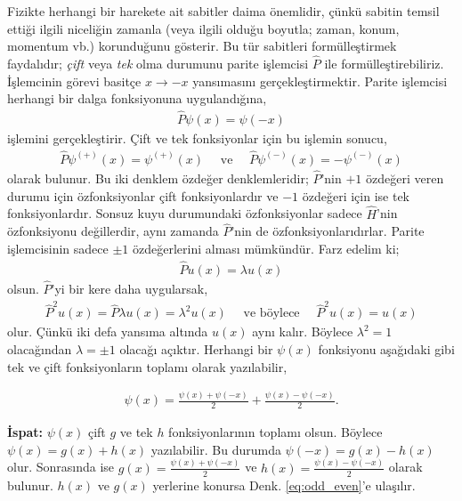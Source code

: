 \documentclass[a4paper,12pt, twoside]{article}
\begin{document}
Fizikte herhangi bir harekete ait sabitler daima önemlidir, çünkü sabitin temsil ettiği ilgili niceliğin zamanla (veya ilgili olduğu boyutla; zaman, konum, momentum vb.) korunduğunu gösterir. Bu tür sabitleri formülleştirmek faydalıdır; \emph{çift} veya \emph{tek} olma durumunu parite işlemcisi $\hat P$ ile formülleştirebiliriz. İşlemcinin görevi basitçe $x\rightarrow -x$ yansımasını gerçekleştirmektir. Parite işlemcisi herhangi bir dalga fonksiyonuna uygulandığına,
\begin{align}
\hat P \psi(x)=\psi(-x)
\end{align}
işlemini gerçekleştirir. Çift ve tek fonksiyonlar için bu işlemin sonucu,
\begin{align}
\hat P \psi^{(+)}(x)=\psi^{(+)}(x)
\quad \text{ ve } \quad \hat P \psi^{(-)}(x)=-\psi^{(-)}(x)
\end{align}
olarak bulunur. Bu iki denklem özdeğer denklemleridir; $\hat P$'nin $+1$ özdeğeri veren durumu için özfonksiyonlar çift fonksiyonlardır ve $-1$ özdeğeri için ise tek fonksiyonlardır. Sonsuz kuyu durumundaki özfonksiyonlar sadece $\hat H$'nin özfonksiyonu değillerdir, aynı zamanda $\hat P$'nin de özfonksiyonlarıdırlar. Parite işlemcisinin sadece $\pm 1$ özdeğerlerini alması mümkündür. Farz edelim ki;
\begin{align}
\hat P u(x)=\lambda u(x)
\end{align}
olsun. $\hat P$'yi bir kere daha uygularsak,
\begin{align}
\hat P^2 u(x)=\hat P \lambda u(x)
= \lambda^2 u(x) \quad \text{ ve böylece }  \quad  \hat P^2 u(x)= u(x) 
\end{align}
olur. Çünkü  iki defa yansıma altında $u(x)$ aynı kalır. Böylece $\lambda^2 = 1$ olacağından $\lambda = \pm 1$ olacağı açıktır. Herhangi bir $\psi(x)$ fonksiyonu aşağıdaki gibi tek ve çift fonksiyonların toplamı olarak yazılabilir,

\begin{align}
\label{eq:odd_even}
\psi(x) = \frac {\psi(x) + \psi(-x)}2  + \frac {\psi(x) - \psi(-x)}2.
\end{align}

\begin{tcolorbox}
{\bf İspat:} $\psi(x)$ çift  $g$ ve tek $h$ fonksiyonlarının toplamı olsun. Böylece $\psi(x) = g(x) + h(x)$ yazılabilir. Bu durumda $\psi(-x) = g(x) - h(x)$ olur. Sonrasında ise $g(x) = \frac {\psi(x) + \psi(-x)}2$ ve $h(x) = \frac {\psi(x) - \psi(-x)}2$ olarak bulunur. $h(x)$ ve $g(x)$ yerlerine konursa Denk. \ref{eq:odd_even}'e ulaşılır.
\end{tcolorbox}
\end{document}
